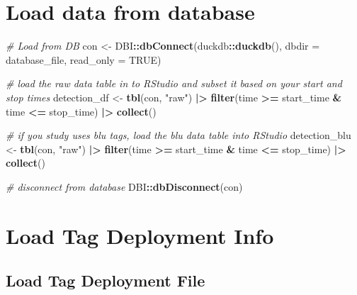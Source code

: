 \documentclass[
]{book}
\newenvironment{Shaded}{\begin{snugshade}}{\end{snugshade}}
\newcommand{\AttributeTok}[1]{\textcolor[rgb]{0.13,0.29,0.53}{#1}}
\newcommand{\CommentTok}[1]{\textcolor[rgb]{0.56,0.35,0.01}{\textit{#1}}}
\newcommand{\ConstantTok}[1]{\textcolor[rgb]{0.56,0.35,0.01}{#1}}
\newcommand{\FunctionTok}[1]{\textcolor[rgb]{0.13,0.29,0.53}{\textbf{#1}}}
\newcommand{\NormalTok}[1]{#1}
\newcommand{\OtherTok}[1]{\textcolor[rgb]{0.56,0.35,0.01}{#1}}
\newcommand{\SpecialCharTok}[1]{\textcolor[rgb]{0.81,0.36,0.00}{\textbf{#1}}}
\newcommand{\StringTok}[1]{\textcolor[rgb]{0.31,0.60,0.02}{#1}}
\begin{document}
\section{Load data from database}\label{load-data-from-database-1}

\begin{Shaded}
\begin{Highlighting}[]
\CommentTok{\# Load from DB}
\NormalTok{con }\OtherTok{\textless{}{-}}\NormalTok{ DBI}\SpecialCharTok{::}\FunctionTok{dbConnect}\NormalTok{(duckdb}\SpecialCharTok{::}\FunctionTok{duckdb}\NormalTok{(), }
                      \AttributeTok{dbdir =}\NormalTok{ database\_file, }
                      \AttributeTok{read\_only =} \ConstantTok{TRUE}\NormalTok{)}

\CommentTok{\# load the raw data table in to RStudio and subset it based on your start and stop times}
\NormalTok{detection\_df }\OtherTok{\textless{}{-}} \FunctionTok{tbl}\NormalTok{(con, }\StringTok{"raw"}\NormalTok{) }\SpecialCharTok{|\textgreater{}} 
  \FunctionTok{filter}\NormalTok{(time }\SpecialCharTok{\textgreater{}=}\NormalTok{ start\_time }\SpecialCharTok{\&}\NormalTok{ time }\SpecialCharTok{\textless{}=}\NormalTok{ stop\_time) }\SpecialCharTok{|\textgreater{}}
  \FunctionTok{collect}\NormalTok{()}

\CommentTok{\# if you study uses blu tags, load the blu data table into RStudio}
\NormalTok{detection\_blu }\OtherTok{\textless{}{-}} \FunctionTok{tbl}\NormalTok{(con, }\StringTok{"raw"}\NormalTok{) }\SpecialCharTok{|\textgreater{}} 
  \FunctionTok{filter}\NormalTok{(time }\SpecialCharTok{\textgreater{}=}\NormalTok{ start\_time }\SpecialCharTok{\&}\NormalTok{ time }\SpecialCharTok{\textless{}=}\NormalTok{ stop\_time) }\SpecialCharTok{|\textgreater{}}
  \FunctionTok{collect}\NormalTok{()}

\CommentTok{\# disconnect from database}
\NormalTok{DBI}\SpecialCharTok{::}\FunctionTok{dbDisconnect}\NormalTok{(con)}
\end{Highlighting}
\end{Shaded}

\section{Load Tag Deployment Info}\label{load-tag-deployment-info}

\subsection{Load Tag Deployment File}\label{load-tag-deployment-file}
\end{document}
